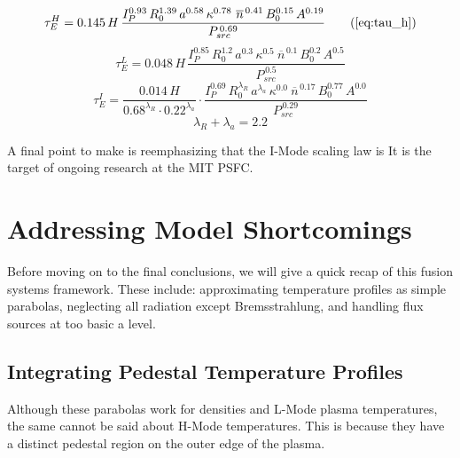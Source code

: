 \begin{equation}
  \tau_E^H = 0.145 \, H \, \frac{
    I_P^{0.93} \, R_0^{1.39} \, a^{0.58} \, \kappa^{0.78} \ \overline{n}^{\, 0.41} \, B_0^{0.15} \, A^{0.19}
  }{ P_{src} ^ {\,0.69} }
  \tag{\ref{eq:tau_h}}
\end{equation}
\begin{equation}
  \tau_E^L = 0.048\, H \, \frac{
    I_P^{0.85} \, R_0^{1.2} \, a^{0.3} \, \kappa^{0.5} \ \overline{n}^{\, 0.1} \, B_0^{0.2} \, A^{0.5} }{ P_{src} ^ {\,0.5} }
\end{equation}
\begin{equation}
  \tau_E^I = \frac{ 0.014 \, H }{ 0.68 ^ {\lambda_R} \cdot 0.22 ^ {\lambda_a} } \cdot \frac{ I_P^{0.69} \, R_0^{\lambda_R} \, a^{\lambda_a} \, \kappa^{0.0} \ \overline{n}^{\, 0.17} \, B_0^{0.77} \, A^{0.0} }{ P_{src} ^ {\,0.29} }
\end{equation}
\begin{equation}
	\lambda_R + \lambda_a = 2.2
\end{equation}

A final point to make is reemphasizing that the I-Mode scaling law is  It is the target of ongoing research at the MIT PSFC.

\section{Addressing Model Shortcomings}

Before moving on to the final conclusions, we will give a quick recap of  this fusion systems framework. These include: approximating temperature profiles as simple parabolas, neglecting all radiation except Bremsstrahlung, and handling flux sources at too basic a level. 

\subsection{Integrating Pedestal Temperature Profiles}

 Although these parabolas work for densities and L-Mode plasma temperatures, the same cannot be said about H-Mode temperatures. This is because they have a distinct pedestal region on the outer edge of the plasma.

